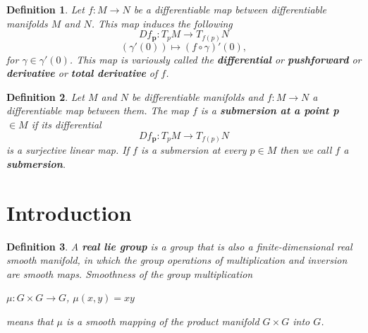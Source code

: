 \documentclass[12pt]{article}
\newtheorem{defn}{Definition}[thm]
\begin{document}
\begin{defn}
  Let $f: M \to N$ be a differentiable map between differentiable manifolds $M$ and $N$. This map induces the following
  \begin{equation*}
    Df_{\mathbf{p}}: T_pM \to T_{f(p)}N
  \end{equation*}
  \begin{equation*}
    (\gamma'(0)) \mapsto (f \circ \gamma)'(0), 
  \end{equation*}
  for $\gamma \in \gamma'(0)$. This map is variously called the \textbf{differential} or \textbf{pushforward} or \textbf{derivative} or \textbf{total derivative} of $f$. 
\end{defn}
\begin{defn}
  Let $M$ and $N$ be differentiable manifolds and $f: M \to N$ a differentiable map between them. The map $f$ is a \textbf{submersion at a point p} $\in M$ if its differential
  \begin{equation*}
    Df_{\mathbf{p}}: T_pM \to T_{f(p)}N
  \end{equation*}
  is a surjective linear map. If  $f$ is a submersion at every $p \in M$ then we call $f$ a \textbf{submersion}.
\end{defn}

\section{Introduction}

\begin{defn}
  A \textbf{real lie group} is a group that is also a finite-dimensional real smooth manifold, in which the group operations of multiplication and inversion are smooth maps. Smoothness of the group multiplication
\begin{center}
  $\mu : G \times G \to G$,  $\mu(x,y)=xy$
\end{center}
  means that $\mu$ is a smooth mapping of the product manifold $G \times G$ into $G$.
\end{defn}
\end{document}

